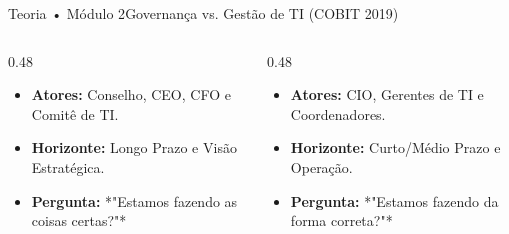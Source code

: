 \begin{senaiframe}{Teoria • Módulo 2}{Governança vs. Gestão de TI (COBIT 2019)}
  \begin{columns}[t]
    \begin{column}{0.48\textwidth}
      \begin{tcolorbox}[senaibluecard, title={Instância de Governança}]
        \begin{itemize}
          \item \textbf{Atores:} Conselho, CEO, CFO e Comitê de TI.
          \item \textbf{Horizonte:} Longo Prazo e Visão Estratégica.
          \item \textbf{Pergunta:} *"Estamos fazendo as coisas certas?"*
        \end{itemize}
      \end{tcolorbox}
    \end{column}
    \begin{column}{0.48\textwidth}
      \begin{tcolorbox}[senaicard, title={Instância de Gestão}]
        \begin{itemize}
          \item \textbf{Atores:} CIO, Gerentes de TI e Coordenadores.
          \item \textbf{Horizonte:} Curto/Médio Prazo e Operação.
          \item \textbf{Pergunta:} *"Estamos fazendo da forma correta?"*
        \end{itemize}
      \end{tcolorbox}
    \end{column}
  \end{columns}
\end{senaiframe}

